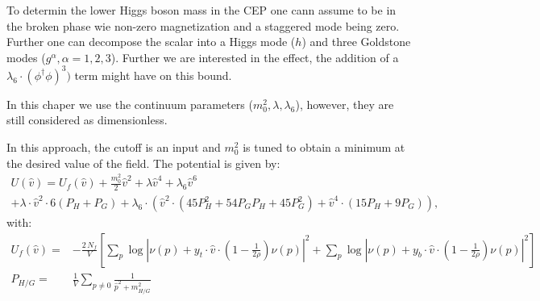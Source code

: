To determin the lower Higgs boson mass in the CEP one cann assume to be in the broken phase wie non-zero
magnetization and a staggered mode being zero. Further one can decompose the scalar into a Higgs mode ($h$) and three 
Goldstone modes ($g^{\alpha}, \alpha=1,2,3$). Further we are interested in the effect, the addition of a $\lambda_6 \cdot (\phi^{\dagger}\phi)^3)$ term
might have on this bound.

In this chaper we use the continuum parameters ($m_0^2, \lambda, \lambda_6$), however, they are still considered as dimensionless.

In this approach, the cutoff is an input and $m_0^2$ is tuned to obtain a minimum at the desired value of the field. The potential is given by:
\begin{multline}\label{eq:CEP_lowerBound_with_phi_6}
 U(\hat v) = U_f(\hat v) + \frac{m_0^2}{2} {\hat v}^2 +\lambda {\hat v}^4 + \lambda_6 {\hat v}^6 \\
                         + \lambda \cdot {\hat v}^2 \cdot 6(P_H+P_G)
                         + \lambda_6 \cdot \left( {\hat v}^2 \cdot ( 45 P_H^2 + 54 P_G P_H + 45 P_G^2)
                         + {\hat v}^4 \cdot ( 15 P_H + 9 P_G ) \right ),
\end{multline}
with:
\begin{align}
 \label{eq:fermionic_contribution_CEP_massbound}
 U_f(\hat v) =& -\frac{2\, N_f}{V} \left[
                 \sum\limits_p \log\left| \nu(p) + y_t \cdot \hat v \cdot \left( 1-\frac{1}{2 \rho} \right) \nu(p) \right|^2 +
                 \sum\limits_p \log\left| \nu(p) + y_b \cdot \hat v \cdot \left( 1-\frac{1}{2 \rho} \right) \nu(p) \right|^2 \right] \\
 \label{eq:def_propagator_sums}
 P_{H/G} =& \frac{1}{V} \sum\limits_{p \neq 0} \frac{1}{{\hat p}^2 + m_{H/G}^2}
\end{align}

